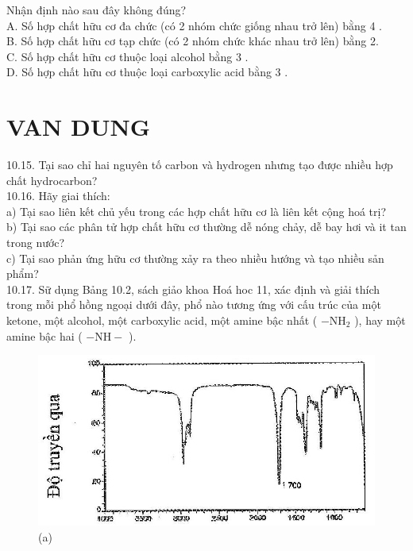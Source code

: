 \documentclass[10pt]{article}
\begin{document}
Nhận định nào sau đây không đúng?\\
A. Số hợp chất hữu cơ đa chức (có 2 nhóm chức giống nhau trở lên) bằng 4 .\\
B. Số hợp chất hữu cơ tạp chức (có 2 nhóm chức khác nhau trở lên) bằng 2.\\
C. Số hợp chất hữu cơ thuộc loại alcohol bằng 3 .\\
D. Số hợp chất hữu cơ thuộc loại carboxylic acid bằng 3 .

\section*{VAN DUNG}
10.15. Tại sao chỉ hai nguyên tố carbon và hydrogen nhưng tạo được nhiều hợp chất hydrocarbon?\\
10.16. Hãy giai thích:\\
a) Tại sao liên kết chủ yếu trong các hợp chất hữu cơ là liên kết cộng hoá trị?\\
b) Tại sao các phân tử hợp chất hữu cơ thường dễ nóng chảy, dễ bay hơi và it tan trong nước?\\
c) Tại sao phản ứng hữu cơ thường xảy ra theo nhiều hướng và tạo nhiều sản phẩm?\\
10.17. Sữ dụng Bảng 10.2, sách giảo khoa Hoá hoc 11, xác định và giải thích trong mỗi phổ hồng ngoại dưới đây, phổ nào tương ứng với cấu trúc của một ketone, một alcohol, một carboxylic acid, một amine bậc nhất ( $-\mathrm{NH}_{2}$ ), hay một amine bậc hai ( $-\mathrm{NH}-$ ).

\begin{figure}[h]
\begin{center}
  \includegraphics[width=\textwidth]{2025_10_23_fa9073eecee116ad8cf2g-38}
\captionsetup{labelformat=empty}
\caption{(a)}
\end{center}
\end{figure}
\end{document}
